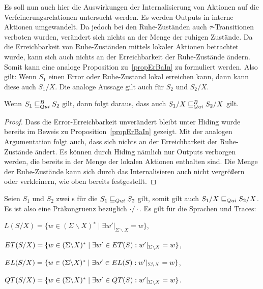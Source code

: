 Es soll nun auch hier die Auswirkungen der Internalisierung von Aktionen auf
die Verfeinerungsrelationen untersucht werden. Es werden Outputs in interne
Aktionen umgewandelt. Da jedoch bei den Ruhe-Zuständen auch
$\tau$-Transitionen verboten wurden, verändert sich nichts an der Menge der
ruhigen Zustände. Da die Erreichbarkeit von Ruhe-Zuständen mittels lokaler
Aktionen betrachtet wurde, kann sich auch nichts an der Erreichbarkeit der
Ruhe-Zustände ändern. Somit kann eine analoge Proposition zu~\ref{propErBaIn}
zu formuliert werden. Also gilt: Wenn $S_1$ einen Error oder Ruhe-Zustand lokal
erreichen kann, dann kann diese auch $S_1/X$. Die analoge Aussage gilt auch für
$S_2$ und $S_2/X$.

\begin{prop}
  Wenn $S_1\sqsubseteq _{Qui}^B S_2$ gilt, dann folgt daraus, dass auch $S_1/X\sqsubseteq _{Qui}^B S_2/X$
  gilt.
\end{prop}

\begin{proof}
  Dass die Error-Erreichbarkeit unverändert bleibt unter Hiding wurde bereits
  im Beweis zu Proposition~\ref{propErBaIn} gezeigt. Mit der analogen
  Argumentation folgt auch, dass sich nichts an der Erreichbarkeit der
  Ruhe-Zustände ändert. Es können durch Hiding nämlich nur Outputs verborgen
  werden, die bereits in der Menge der lokalen Aktionen enthalten sind. Die
  Menge der Ruhe-Zustände kann sich durch das Internalisieren auch nicht
  vergrößern oder verkleinern, wie oben bereits festgestellt.
\end{proof}

\begin{satz}
\label{satzPraeInterQui}
  Seien $S_1$ und $S_2$ zwei \EIO{}s für die $S_1\sqsubseteq _{Qui} S_2$ gilt, somit gilt
  auch $S_1/X\sqsubseteq _{Qui} S_2/X$. Es ist also \QRel{} eine Präkongruenz bezüglich
  $\cdot /\cdot$. Es gilt für die Sprachen und Traces:
  \begin{compactenum}[(i)]
  \item $L(S/X) = \{w\in (\Sigma\backslash X){}^*\mid \exists
      w'|_{\Sigma\backslash X} = w\}$,
    \item $ET{}(S/X) = \{w\in (\Sigma\backslash X){}^*\mid \exists
      w'\in ET{}(S): w'|_{\Sigma\backslash X} = w\}$,
    \item $EL{}(S/X) = \{w\in (\Sigma\backslash X){}^*\mid \exists w'\in
      EL(S): w'|_{\Sigma\backslash X} = w\}$,
    \item $QT{}(S/X) = \{w\in (\Sigma\backslash X){}^*\mid \exists w'\in
      QT{}(S):w'|_{\Sigma\backslash X}=w\}$.
  \end{compactenum}
\end{satz}

